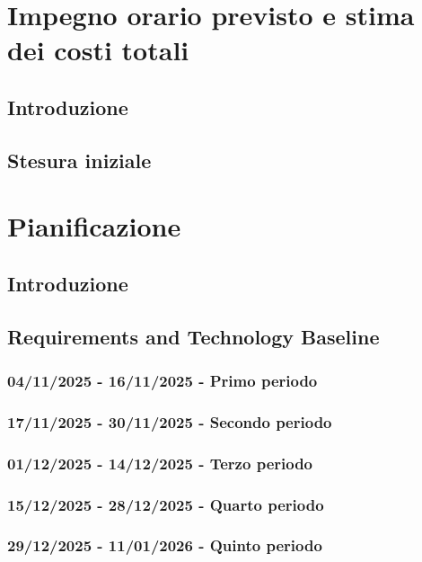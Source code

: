 \documentclass[a4paper,12pt]{article}
\begin{document}
\newpage
\section{Impegno orario previsto e stima dei costi totali}
    \subsection{Introduzione}
    \subsection{Stesura iniziale}

\newpage
\section{Pianificazione}
\label{sec:pianificazione}
    \subsection{Introduzione}
    \subsection{Requirements and Technology Baseline}

        \subsubsection{04/11/2025 - 16/11/2025 - Primo periodo}
        
        \subsubsection{17/11/2025 - 30/11/2025 - Secondo periodo}

        \subsubsection{01/12/2025 - 14/12/2025 - Terzo periodo}

        \subsubsection{15/12/2025 - 28/12/2025 - Quarto periodo}

        \subsubsection{29/12/2025 - 11/01/2026 - Quinto periodo}
    
\end{document}
